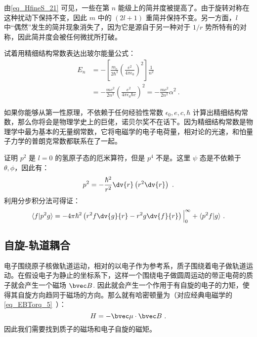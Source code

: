 由\autoref{eq_HfineS_21} 可见，一些在第 $n$ 能级上的简并度被提高了。由于旋转对称在这种扰动下保持不变，因此 $m$ 中的 $(2l+1)$ 重简并保持不变。另一方面，$l$ 中“偶然”发生的简并现象消失了，因为它是源自于另一种对于 $1/r$ 势所特有的对称，因此简并度会被任何微扰所打破。
\begin{example}{}
试着用精细结构常数表达出玻尔能量公式：
\begin{align}
E_n&=-\left[\frac {m_e}{2\hbar^{2}} \left(\frac {e^ {2}}{4\pi \epsilon_0}\right)^ {2}\right]  \frac {1}{n^2}\\
&=-\frac{mc^2}{2n^2}\left(\frac {e^{2}}{4\pi \epsilon_0\hbar c}\right)^2=-\frac{mc^2}{2n^2}\alpha^2~.
\end{align}
\end{example}

如果你能够从第一性原理，不依赖于任何经验性常数 $\epsilon_0,e,c,\hbar$ 计算出精细结构常数，那么你将会是物理学史上的巨佬，诺贝尔奖不在话下。因为精细结构常数是物理学中最为基本的无量纲常数，它将电磁学的电子电荷量，相对论的光速，和怕量子力学的普朗克常数都联系在了一起。

\begin{example}{}
证明 $p^2$ 是 $l=0$ 的氢原子态的厄米算符，但是 $p^4$ 不是。这里 $\psi$ 态是不依赖于 $\theta,\phi$，因此有：
\begin{equation}
p^2=-\frac{\hbar^2}{r^2}\dv{r}\left(r^2\dv{r}\right)~.
\end{equation}
利用分步积分法可得证：
\begin{equation}
\langle f|p^2g\rangle = -4\pi\hbar^2\left(r^2f\dv{g}{r}-r^2g\dv{f}{r}\right)\Big|_0^\infty+\langle p^2f|g\rangle~.
\end{equation}

\end{example}
\subsection{自旋-轨道耦合}
电子围绕原子核做轨道运动，相对的以电子作为参考系，质子围绕着电子做轨道运动。在假设电子为静止的坐标系下，这样一个围绕电子做圆周运动的带正电荷的质子就会产生一个磁场 $\bvec B$. 因此就会产生一个作用于有自旋的电子的力矩，使得其自旋方向趋同于磁场的方向。那么就有哈密顿量为（对应经典电磁学的\autoref{eq_EBTorq_5}~）：
\begin{equation}\label{eq_HfineS_26}
H=-\bvec\mu \cdot \bvec B~.
\end{equation}
因此我们需要找到质子的磁场和电子自旋的磁矩。

